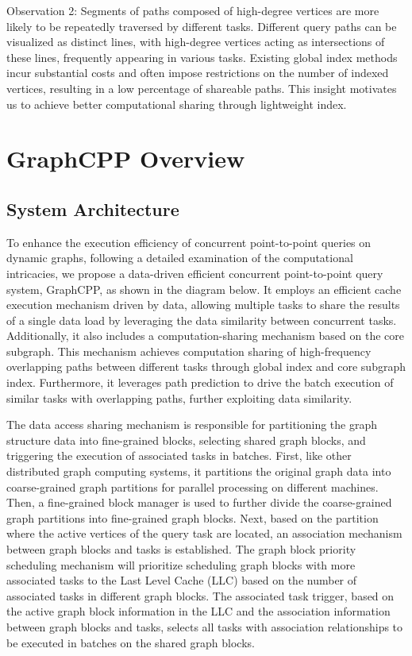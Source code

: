 \documentclass[lettersize,journal]{IEEEtran} %
\begin{document}
Observation 2: Segments of paths composed of high-degree vertices are more likely to be repeatedly traversed by different tasks. Different query paths can be visualized as distinct lines, with high-degree vertices acting as intersections of these lines, frequently appearing in various tasks. Existing global index methods incur substantial costs and often impose restrictions on the number of indexed vertices, resulting in a low percentage of shareable paths. This insight motivates us to achieve better computational sharing through lightweight index.


\section{GraphCPP Overview}

\subsection{System Architecture}
To enhance the execution efficiency of concurrent point-to-point queries on dynamic graphs, following a detailed examination of the computational intricacies, we propose a data-driven efficient concurrent point-to-point query system, GraphCPP, as shown in the diagram below. It employs an efficient cache execution mechanism driven by data, allowing multiple tasks to share the results of a single data load by leveraging the data similarity between concurrent tasks. Additionally, it also includes a computation-sharing mechanism based on the core subgraph. This mechanism achieves computation sharing of high-frequency overlapping paths between different tasks through global index and core subgraph index. Furthermore, it leverages path prediction to drive the batch execution of similar tasks with overlapping paths, further exploiting data similarity.

The data access sharing mechanism is responsible for partitioning the graph structure data into fine-grained blocks, selecting shared graph blocks, and triggering the execution of associated tasks in batches. First, like other distributed graph computing systems, it partitions the original graph data into coarse-grained graph partitions for parallel processing on different machines. Then, a fine-grained block manager is used to further divide the coarse-grained graph partitions into fine-grained graph blocks. Next, based on the partition where the active vertices of the query task are located, an association mechanism between graph blocks and tasks is established. The graph block priority scheduling mechanism will prioritize scheduling graph blocks with more associated tasks to the Last Level Cache (LLC) based on the number of associated tasks in different graph blocks. The associated task trigger, based on the active graph block information in the LLC and the association information between graph blocks and tasks, selects all tasks with association relationships to be executed in batches on the shared graph blocks.
\end{document}
